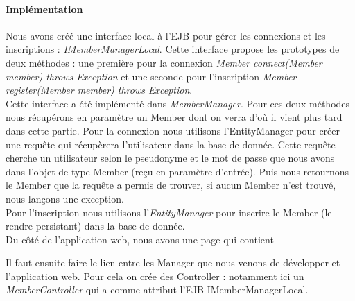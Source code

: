 \documentclass[a4paper,11pt]{report}
\begin{document}
      \paragraph{Implémentation}
        Nous avons créé une interface local à l'EJB pour gérer les connexions et les inscriptions : \textit{IMemberManagerLocal}. Cette interface propose les prototypes de deux méthodes : une première pour la connexion \textit{Member connect(Member member) throws Exception} et une seconde pour l'inscription \textit{Member register(Member member) throws Exception}.\\
        Cette interface a été implémenté dans \textit{MemberManager}. Pour ces deux méthodes nous récupérons en paramètre un Member dont on verra d'où il vient plus tard dans cette partie. Pour la connexion nous utilisons l'EntityManager pour créer une requête qui récupèrera l'utilisateur dans la base de donnée. Cette requête cherche un utilisateur selon le pseudonyme et le mot de passe que nous avons dans l'objet de type Member (reçu en paramètre d'entrée). Puis nous retournons le Member que la requête a permis de trouver, si aucun Member n'est trouvé, nous lançons une exception.\\
        Pour l'inscription nous utilisons l'\textit{EntityManager} pour inscrire le Member (le rendre persistant) dans la base de donnée.\\
        
        Du côté de l'application web, nous avons une page qui contient 
        
        Il faut ensuite faire le lien entre les Manager que nous venons de développer et l'application web. Pour cela on crée des Controller : notamment ici un \textit{MemberController} qui a comme attribut l'EJB IMemberManagerLocal.
      
\end{document}
